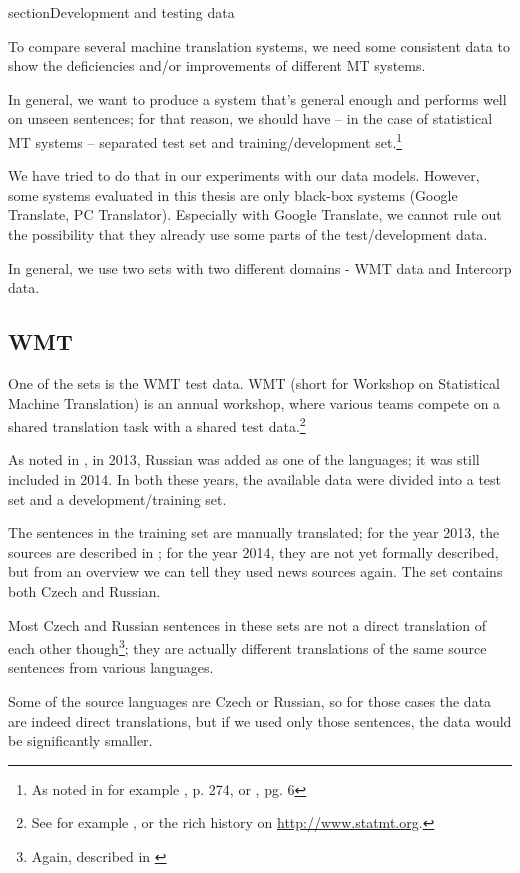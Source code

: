 section{Development and testing data}

To compare several machine translation systems, we need some consistent data to show the deficiencies and/or improvements of different MT systems.

In general, we want to produce a system that's general enough and performs well on unseen sentences; for that reason, we should have -- in the case of statistical MT systems -- separated test set and training/development set.\footnote{As noted in for example \cite{koehn2010statistical}, p. 274, or \cite{bishop}, pg. 6}

We have tried to do that in our experiments with our data models. However, some systems evaluated in this thesis are only black-box systems (Google Translate, PC Translator). Especially with Google Translate, we cannot rule out the possibility that they already use some parts of the test/development data.


In general, we use two sets with two different domains - WMT data and Intercorp data.

\subsection{WMT}
One of the sets is the WMT test data. 
WMT (short for Workshop on Statistical Machine Translation) is an annual workshop, where various teams compete on a shared translation task with a shared test data.\footnote{See for example \cite{wmt_findings_2013}, or the rich history on \url{http://www.statmt.org}.}

As noted in \cite{wmt_findings_2013}, in 2013, Russian was added as one of the languages; it was still included in 2014. In both these years, the available data were divided into a test set and a development/training set.

The sentences in the training set are manually translated; for the year 2013, the sources are described in \cite{wmt_findings_2013}; for the year 2014, they are not yet formally described, but from an overview we can tell they used news sources again. The set contains both Czech and Russian.


Most Czech and Russian sentences in these sets are not a direct translation of each other though\footnote{Again, described in \cite{wmt_findings_2013}}; they are actually different translations of the same source sentences from various languages. 

Some of the source languages are Czech or Russian, so for those cases the data are indeed direct translations, but if we used only those sentences, the data would be significantly smaller.

